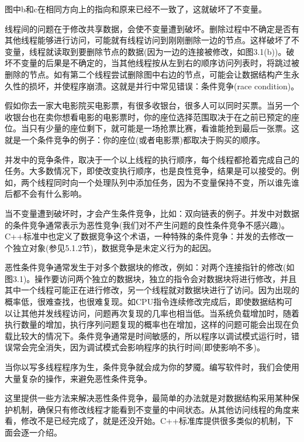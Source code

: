 图中b和c在相同方向上的指向和原来已经不一致了，这就破坏了不变量。

线程间的问题在于修改共享数据，会使不变量遭到破坏。删除过程中不确定是否有其他线程能够进行访问，可能就有线程访问到刚刚删除一边的节点。这样破坏了不变量，线程就读取到要删除节点的数据(因为一边的连接被修改，如图3.1(b))。破坏不变量的后果是不确定的，当其他线程按从左到右的顺序访问列表时，将跳过被删除的节点。如有第二个线程尝试删除图中右边的节点，可能会让数据结构产生永久性的损坏，并使程序崩溃。这就是并行中常见错误：条件竞争(race condition)。


假如你去一家大电影院买电影票，有很多收银台，很多人可以同时买票。当另一个收银台也在卖你想看电影的电影票时，你的座位选择范围取决于在之前已预定的座位。当只有少量的座位剩下，就可能是一场抢票比赛，看谁能抢到最后一张票。这就是一个条件竞争的例子：你的座位(或者电影票)都取决于购买的顺序。

并发中的竞争条件，取决于一个以上线程的执行顺序，每个线程都抢着完成自己的任务。大多数情况下，即使改变执行顺序，也是良性竞争，结果是可以接受的。例如，两个线程同时向一个处理队列中添加任务，因为不变量保持不变，所以谁先谁后都不会有什么影响。

当不变量遭到破坏时，才会产生条件竞争，比如：双向链表的例子。并发中对数据的条件竞争通常表示为恶性竞争(我们对不产生问题的良性条件竞争不感兴趣)。C++标准中也定义了数据竞争这个术语，一种特殊的条件竞争：并发的去修改一个独立对象(参见5.1.2节)，数据竞争是未定义行为的起因。

恶性条件竞争通常发生于对多个数据块的修改，例如：对两个连接指针的修改(如图3.1)。操作要访问两个独立的数据块，独立的指令会对数据块将进行修改，并且其中一个线程可能正在进行修改，另一个线程就对数据块进行了访问。因为出现的概率低，很难查找，也很难复现。如CPU指令连续修改完成后，即使数据结构可以让其他并发线程访问，问题再次复现的几率也相当低。当系统负载增加时，随着执行数量的增加，执行序列问题复现的概率也在增加，这样的问题可能会出现在负载比较大的情况下。条件竞争通常是时间敏感的，所以程序以调试模式运行时，错误常会完全消失，因为调试模式会影响程序的执行时间(即使影响不多)。

当你以写多线程程序为生，条件竞争就会成为你的梦魇。编写软件时，我们会使用大量复杂的操作，来避免恶性条件竞争。


这里提供一些方法来解决恶性条件竞争，最简单的办法就是对数据结构采用某种保护机制，确保只有修改线程才能看到不变量的中间状态。从其他访问线程的角度来看，修改不是已经完成了，就是还没开始。C++标准库提供很多类似的机制，下面会逐一介绍。


